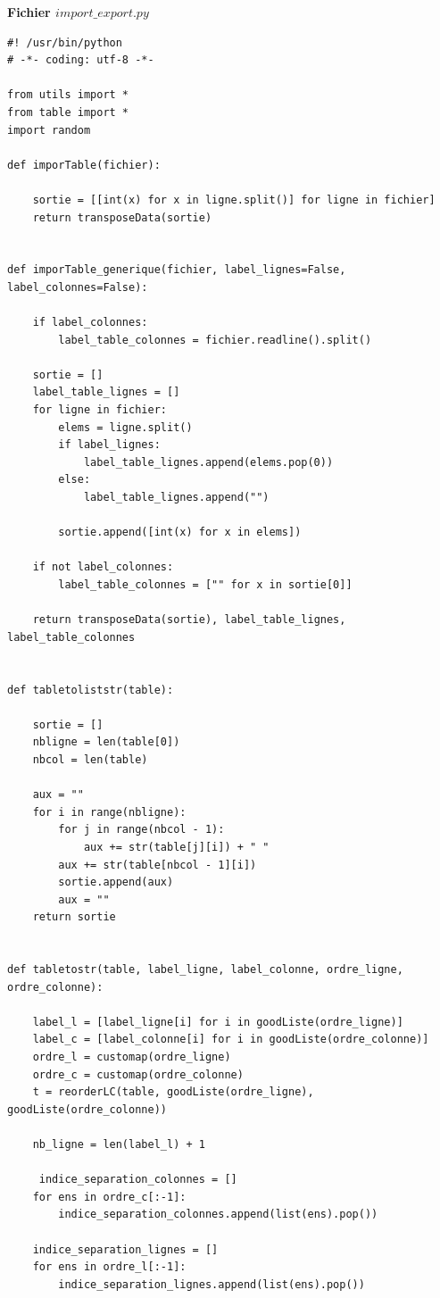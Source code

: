 \documentclass[a4paper]{report}
\renewcommand{\textbf}[1]{\begingroup\bfseries\mathversion{bold}#1\endgroup}
\begin{document}
\textbf{Fichier $import\_export.py$}
\begin{lstlisting}
#! /usr/bin/python
# -*- coding: utf-8 -*-

from utils import *
from table import *
import random

def imporTable(fichier):
      
    sortie = [[int(x) for x in ligne.split()] for ligne in fichier]
    return transposeData(sortie)
  
  
def imporTable_generique(fichier, label_lignes=False, label_colonnes=False):
    
    if label_colonnes:
        label_table_colonnes = fichier.readline().split()
      
    sortie = []
    label_table_lignes = []
    for ligne in fichier:
        elems = ligne.split()
        if label_lignes:
            label_table_lignes.append(elems.pop(0))
        else:
            label_table_lignes.append("")
        
        sortie.append([int(x) for x in elems])
  
    if not label_colonnes:
        label_table_colonnes = ["" for x in sortie[0]]
      
    return transposeData(sortie), label_table_lignes, label_table_colonnes


def tabletoliststr(table):
    
    sortie = []
    nbligne = len(table[0])
    nbcol = len(table)
    
    aux = ""
    for i in range(nbligne):
        for j in range(nbcol - 1):
            aux += str(table[j][i]) + " "
        aux += str(table[nbcol - 1][i])
        sortie.append(aux)
        aux = ""
    return sortie


def tabletostr(table, label_ligne, label_colonne, ordre_ligne, ordre_colonne):
    
    label_l = [label_ligne[i] for i in goodListe(ordre_ligne)]
    label_c = [label_colonne[i] for i in goodListe(ordre_colonne)]
    ordre_l = customap(ordre_ligne)
    ordre_c = customap(ordre_colonne)
    t = reorderLC(table, goodListe(ordre_ligne), goodListe(ordre_colonne))
    
    nb_ligne = len(label_l) + 1
    
     indice_separation_colonnes = []
    for ens in ordre_c[:-1]:
        indice_separation_colonnes.append(list(ens).pop())
      
    indice_separation_lignes = []
    for ens in ordre_l[:-1]:
        indice_separation_lignes.append(list(ens).pop())
      

\end{lstlisting}
\end{document}
